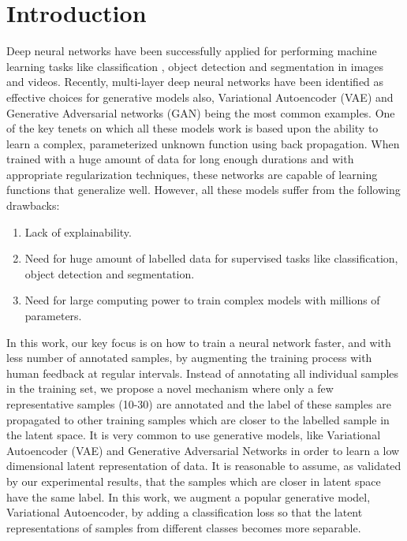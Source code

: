 \documentclass[runningheads]{llncs}
\begin{document}
\section{Introduction}
Deep neural networks have been successfully applied  for performing machine learning tasks like classification \cite{alexnet,vggnet,resnet}, object detection \cite{faster_rcnn,yolo} and segmentation \cite{deeplab,unet} in images and videos.
Recently, multi-layer deep neural networks have been identified as  effective  choices for  generative models also, Variational Autoencoder (VAE) \cite{vae} and Generative Adversarial networks (GAN) \cite{gan} being the most common examples.
One of the key tenets on which all these models work is  based upon the ability to learn a complex, parameterized unknown function using back propagation.
When trained with a huge amount of data for long enough durations and with appropriate regularization techniques, these networks are capable of learning functions that generalize well.
However, all these  models suffer from the following drawbacks:
\begin{enumerate}
  \item Lack of explainability.
  \item Need for huge amount of labelled data for supervised tasks like classification, object detection and segmentation.
  \item Need for large computing power to train complex models with millions of parameters.
\end{enumerate}

In this work, our key focus is on how to train a neural network faster, and with less number of annotated samples, by augmenting the training process with human feedback at regular intervals.
Instead of annotating all individual samples in the training set, we propose a novel mechanism where only a few representative samples (10-30) are annotated and the label of these samples are propagated to other training samples  which are closer to the labelled sample in the latent space.
It is very common to use  generative models, like Variational Autoencoder (VAE) \cite{vae} and Generative Adversarial Networks \cite{gan} in order to learn a low dimensional latent representation of data.
It is reasonable to assume, as validated by our experimental results, that the samples which are closer in latent space have the same label.
In this work, we augment a popular generative model, Variational Autoencoder,  by adding a classification loss so that the latent representations of samples from different classes becomes more separable.
\end{document}
